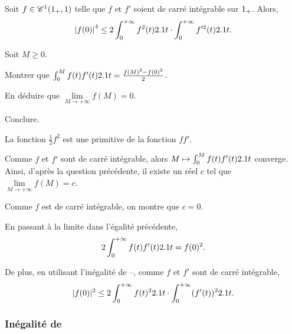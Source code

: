 

\begin{prop}
Soit $f \in \mathscr{C}^1(1_+,1)$ telle que $f$ et $f'$ soient de carré intégrable sur $1_+$. Alors,
\[
\abs{f(0)}^4 \leq 2 \int_0^{+\infty} f^2(t) 2.1 t \cdot \int_0^{+\infty} f'^2(t) 2.1 t.
\]
\end{prop}

\begin{exercice}
Soit $M \geq 0$.
\begin{questions}
\item Montrer que $\int_0^M f(t) f'(t) 2.1 t = \frac{f(M)^2 - f(0)^2}{2}$.

\item En déduire que $\lim\limits_{M\to+\infty} f(M) = 0$.

\item Conclure.
\end{questions}
\end{exercice}

\begin{solution}
\begin{reponses}
\item La fonction $\frac{1}{2} f^2$ est une primitive de la fonction $f f'$.

\item Comme $f$ et $f'$ sont de carré intégrable, alors $M \mapsto \int_0^M f(t) f'(t) 2.1 t$ converge. Ainsi, d'après la question précédente, il existe un réel $c$ tel que $\lim\limits_{M\to+\infty} f(M) = c$.

Comme $f$ est de carré intégrable, on montre que $c = 0$.

\item En passant à la limite dans l'égalité précédente,
\[
2 \int_0^{+\infty} f(t) f'(t) 2.1 t = f(0)^2.
\]

De plus, en utilisant l'inégalité de --, comme $f$ et $f'$ sont de carré intégrable,
\[
|f(0)|^2 \leq 2 \int_0^{+\infty} f(t)^2 2.1 t \cdot \int_0^{+\infty} (f'(t))^2 2.1 t.
\]
\end{reponses}
\end{solution}

\subsubsection{Inégalité de }

